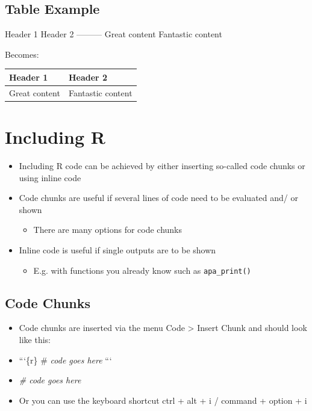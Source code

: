 \documentclass[
]{book}
\newenvironment{Shaded}{\begin{snugshade}}{\end{snugshade}}
\newcommand{\CommentTok}[1]{\textcolor[rgb]{0.56,0.35,0.01}{\textit{#1}}}
\providecommand{\tightlist}{%
  \setlength{\itemsep}{0pt}\setlength{\parskip}{0pt}}
\begin{document}
\subsection{Table Example}\label{table-example}

Header 1 \textbar{} Header 2
-----\textbar-----
Great content \textbar{} Fantastic content

Becomes:

\begin{longtable}[]{@{}ll@{}}
\toprule\noalign{}
Header 1 & Header 2 \\
\midrule\noalign{}
\endhead
\bottomrule\noalign{}
\endlastfoot
Great content & Fantastic content \\
\end{longtable}

\section{Including R}\label{including-r}

\begin{itemize}
\tightlist
\item
  Including R code can be achieved by either inserting so-called code chunks or using inline code
\item
  Code chunks are useful if several lines of code need to be evaluated and/ or shown

  \begin{itemize}
  \tightlist
  \item
    There are many options for code chunks
  \end{itemize}
\item
  Inline code is useful if single outputs are to be shown

  \begin{itemize}
  \tightlist
  \item
    E.g. with functions you already know such as \texttt{apa\_print()}
  \end{itemize}
\end{itemize}

\subsection{Code Chunks}\label{code-chunks}

\begin{itemize}
\item
  Code chunks are inserted via the menu Code \textgreater{} Insert Chunk and should look like this:
\item
  ```\{r\}
  \# \emph{code goes here}
  ```
\item
\begin{Shaded}
\begin{Highlighting}[]
\CommentTok{\# code goes here}
\end{Highlighting}
\end{Shaded}
\item
  Or you can use the keyboard shortcut ctrl + alt + i / command + option + i
\end{itemize}
\end{document}
